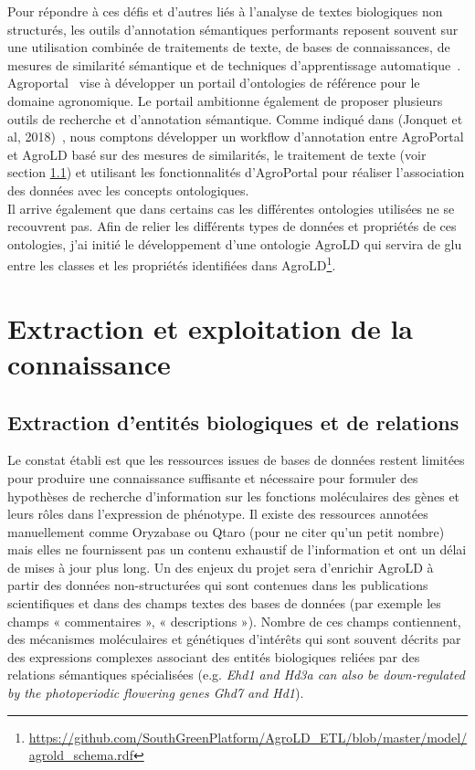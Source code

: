 Pour répondre à ces défis et d'autres liés à l'analyse de textes biologiques non structurés, les outils d'annotation sémantiques performants reposent souvent sur une utilisation combinée de traitements de texte, de bases de connaissances, de mesures de similarité sémantique et de techniques d'apprentissage automatique~\cite{Jovanovic2017a}. Agroportal~\cite{Jonquet2018} vise à développer un portail d'ontologies de référence pour le domaine agronomique. Le portail ambitionne également de proposer plusieurs outils de recherche et d'annotation sémantique. Comme indiqué dans (Jonquet et al, 2018)~\cite{Jonquet2018}, nous comptons développer un workflow d’annotation entre AgroPortal et AgroLD basé sur des mesures de similarités, le traitement de texte (voir section \ref{NLP}) et utilisant les fonctionnalités d’AgroPortal pour réaliser l’association des données avec les concepts ontologiques. \\

Il arrive également que dans certains cas les différentes ontologies utilisées ne se recouvrent pas. Afin de relier les différents types de données et propriétés de ces ontologies, j'ai initié le développement d’une ontologie AgroLD qui servira de glu entre les classes et les propriétés identifiées dans AgroLD\footnote{\url{https://github.com/SouthGreenPlatform/AgroLD_ETL/blob/master/model/agrold\_schema.rdf}}. \\


\section{Extraction et exploitation de la connaissance}

\subsection{Extraction d’entités biologiques et de relations}
\label{NLP}

Le constat établi est que les ressources issues de bases de données restent limitées pour produire une connaissance suffisante et nécessaire pour formuler des hypothèses de recherche d’information sur les fonctions moléculaires des gènes et leurs rôles dans l’expression de phénotype. Il existe des ressources annotées manuellement comme Oryzabase ou Qtaro (pour ne citer qu'un petit nombre) mais elles ne fournissent pas un contenu exhaustif de l'information et ont un délai de mises à jour plus long. Un des enjeux du projet sera d'enrichir AgroLD à partir des données non-structurées qui sont contenues dans les publications scientifiques et dans des champs textes des bases de données (par exemple les champs « commentaires », « descriptions »). Nombre de ces champs contiennent, des mécanismes moléculaires et génétiques d’intérêts qui sont souvent décrits par des expressions complexes associant des entités biologiques reliées par des relations sémantiques spécialisées (e.g. \textit{Ehd1 and Hd3a can also be down-regulated by the photoperiodic flowering genes Ghd7 and Hd1}).\\

